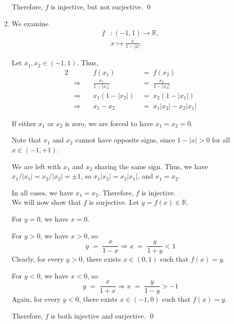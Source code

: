\documentclass[10pt]{article}
\begin{document}
\begin{enumerate}
		Therefore, $f$ is injective, but not surjective. \qed
		
		\item We examine
		\begin{align*}
			f&: (-1, 1) \to \mathbb{R},\\
			&x \mapsto  \frac{x}{1 - |x|}.
		\end{align*}
		
		Let $x_1, x_2 \in (-1, 1)$. Thus,
		\begin{alignat*}{2}
			&&f(x_1) \;&=\; f(x_2) \\
			&\Rightarrow\quad& \frac{x_1}{1 - |x_1|} \;&=\; \frac{x_2}{1 - |x_2|} \\
			&\Rightarrow\quad& x_1(1 - |x_2|) \;&=\; x_2(1 - |x_1|) \tag{$|x| \neq 1$}\\
			&\Rightarrow\quad& x_1 - x_2 \;&=\; x_1|x_2| - x_2|x_1|
		\end{alignat*}
		
		If either $x_1$ or $x_2$ is zero, we are forced to have $x_1 = x_2 = 0$.
		
		Note that $x_1$ and $x_2$ cannot have opposite signs, since $1 - |x| > 0$ for all $x \in (-1,+1)$.
		
		We are left with $x_1$ and $x_2$ sharing the same sign. Thus, we have $x_1 / |x_1| = x_2 / |x_2| = \pm 1$, so $x_1|x_2| = x_2|x_1|$,
		and $x_1 = x_2$.
		
		In all cases, we have $x_1 = x_2$. Therefore, $f$ is injective. \\
		
		We will now show that $f$ is surjective. Let $y = f(x) \in \mathbb{R}$.
		
		For $y = 0$, we have $x = 0$.
		
		For $y > 0$, we have $x > 0$, so
		\[
		y \;=\; \frac{x}{1-x} \Rightarrow x \;=\; \frac{y}{1+y} < 1 \tag{$1 + y > y > 0$}
		\]
		Clearly, for every $y > 0$, there exists $x \in (0, 1)$ such that $f(x) = y$.
		
		For $y < 0$, we have $x < 0$, so
		\[
		y \;=\; \frac{x}{1+x} \Rightarrow x \;=\; \frac{y}{1-y} > -1 \tag{$0 > y > y - 1$}
		\]
		Again, for every $y < 0$, there exists $x \in (-1, 0)$ such that $f(x) = y$.
		
		Therefore, $f$ is both injective and surjective. \qed
		
	\end{enumerate} 
\end{document}
